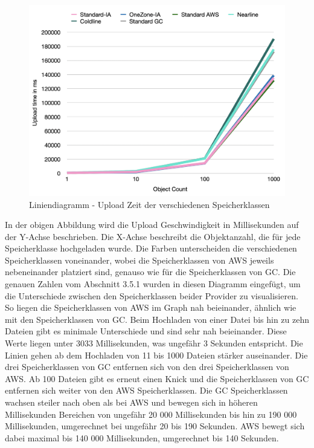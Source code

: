 \begin{figure}[h]
	\centering
	\includegraphics[width=13cm,keepaspectratio]{Pictures/UploadTime.png}
	\caption{Liniendiagramm - Upload Zeit der verschiedenen Speicherklassen}
\end{figure}	

In der obigen Abbildung wird die Upload Geschwindigkeit in Millisekunden auf der Y-Achse beschrieben. Die X-Achse beschreibt die Objektanzahl, die für jede Speicherklasse hochgeladen wurde. Die Farben unterscheiden die verschiedenen Speicherklassen voneinander, wobei die Speicherklassen von AWS jeweils nebeneinander platziert sind, genauso wie für die Speicherklassen von GC. Die genauen Zahlen vom Abschnitt 3.5.1 wurden in diesen Diagramm eingefügt, um die Unterschiede zwischen den Speicherklassen beider Provider zu visualisieren. So liegen die Speicherklassen von AWS im Graph nah beieinander, ähnlich wie mit den Speicherklassen von GC. Beim Hochladen von einer Datei bis hin zu zehn Dateien gibt es minimale Unterschiede und sind sehr nah beieinander. Diese Werte liegen unter 3033 Millisekunden, was ungefähr 3 Sekunden entspricht. Die Linien gehen ab dem Hochladen von 11 bis 1000 Dateien stärker auseinander. Die drei Speicherklassen von GC entfernen sich von den drei Speicherklassen von AWS. Ab 100 Dateien gibt es erneut einen Knick und die Speicherklassen von GC entfernen sich weiter von den AWS Speicherklassen. Die GC Speicherklassen wachsen steiler nach oben als bei AWS und bewegen sich in höheren Millisekunden Bereichen von ungefähr 20 000 Millisekunden bis hin zu 190 000 Millisekunden, umgerechnet bei ungefähr 20 bis 190 Sekunden. AWS bewegt sich dabei maximal bis 140 000 Millisekunden, umgerechnet bis 140 Sekunden. 

